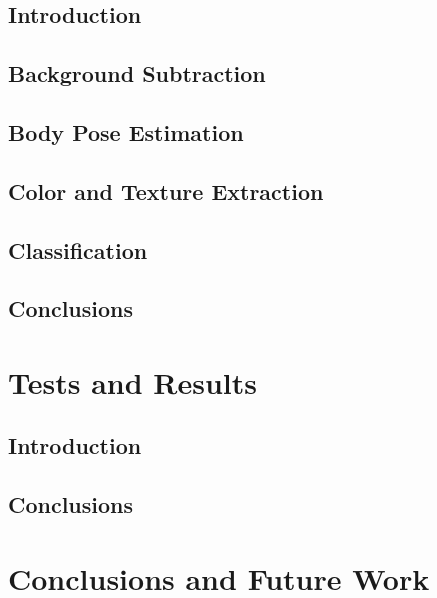 \documentclass[titlepage,12pt,a4paper,times]{book}
\begin{document}
\section{Introduction}
\label{chap3:sec:intro}

\section{Background Subtraction}
\label{chap3:sec:bs}

\section{Body Pose Estimation}
\label{chap3:sec:bps}

\section{Color and Texture Extraction}
\label{chap3:sec:cte}

\section{Classification}
\label{chap3:sec:nnt}

\section{Conclusions}
\label{chap3:sec:concs}

\chapter{Tests and Results}
\label{chap:res}

\section{Introduction}
\label{chap4:sec:intro}

\section{}
\label{chap4:sec:...}

\section{Conclusions}
\label{chap4:sec:concs}

\chapter{Conclusions and Future Work}
\label{chap:cfw}
\end{document}
